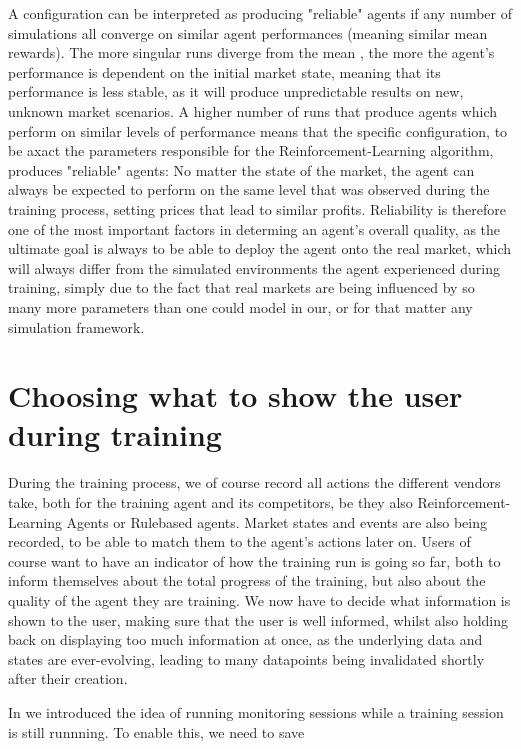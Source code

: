 A configuration can be interpreted as producing "reliable" agents if any number of simulations all converge on similar agent performances (meaning similar mean rewards). The more singular runs diverge from the mean , the more the agent's performance is dependent on the initial market state, meaning that its performance is less stable, as it will produce unpredictable results on new, unknown market scenarios. A higher number of runs that produce agents which perform on similar levels of performance means that the specific configuration, to be axact the parameters responsible for the Reinforcement-Learning algorithm, produces "reliable" agents: No matter the state of the market, the agent can always be expected to perform on the same level that was observed during the training process, setting prices that lead to similar profits. Reliability is therefore one of the most important factors in determing an agent's overall quality, as the ultimate goal is always to be able to deploy the agent onto the real market, which will always differ from the simulated environments the agent experienced during training, simply due to the fact that real markets are being influenced by so many more parameters than one could model in our, or for that matter any simulation framework. 

\section{Choosing what to show the user during training}

During the training process, we of course record all actions the different vendors take, both for the training agent and its competitors, be they also Reinforcement-Learning Agents or Rulebased agents. Market states and events are also being recorded, to be able to match them to the agent's actions later on. Users of course want to have an indicator of how the training run is going so far, both to inform themselves about the total progress of the training, but also about the quality of the agent they are training. We now have to decide what information is shown to the user, making sure that the user is well informed, whilst also holding back on displaying too much information at once, as the underlying data and states are ever-evolving, leading to many datapoints being invalidated shortly after their creation.

In  we introduced the idea of running monitoring sessions while a training session is still runnning. To enable this, we need to save 


